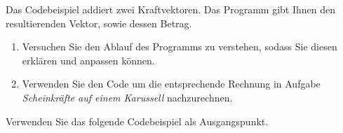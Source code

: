 \begin{ExerciseBlock}
Das Codebeispiel addiert zwei Kraftvektoren. Das Programm gibt Ihnen den resultierenden Vektor, sowie dessen Betrag.

\begin{enumerate}
	\item Versuchen Sie den Ablauf des Programms zu verstehen, sodass Sie diesen erklären und anpassen können.

	\item Verwenden Sie den Code um die entsprechende Rechnung in Aufgabe \textit{Scheinkräfte auf einem Karussell} nachzurechnen.

\end{enumerate}

Verwenden Sie das folgende Codebeispiel als Ausgangspunkt.
\end{ExerciseBlock}
\clearpage
{}

